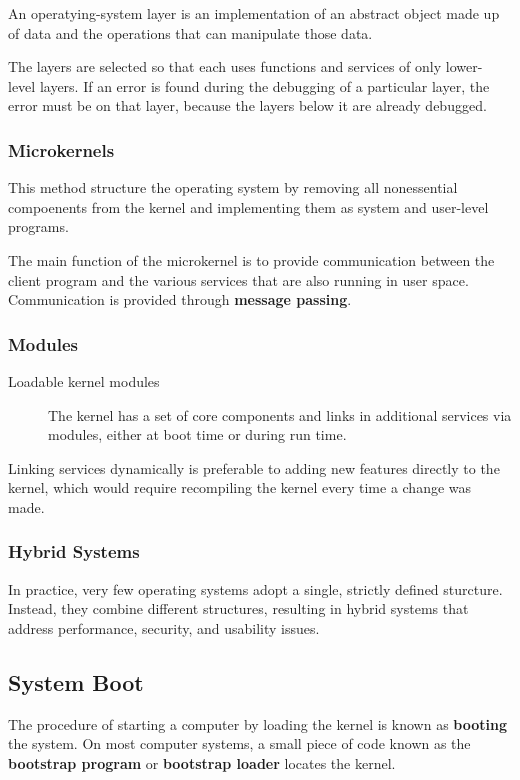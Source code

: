 \documentclass[]{article}
\begin{document}
An operatying-system layer is an implementation of an abstract object made up of
data and the operations that can manipulate those data.

The layers are selected so that each uses functions and services of only lower-
level layers. If an error is found during the debugging of a particular layer,
the error must be on that layer, because the layers below it are already
debugged.

\subsubsection*{Microkernels}
This method structure the operating system by removing all nonessential
compoenents from the kernel and implementing them as system and user-level
programs.

The main function of the microkernel is to provide communication between the
client program and the various services that are also running in user space.
Communication is provided through \textbf{message passing}.

\subsubsection*{Modules}
\begin{description}
\item[Loadable kernel modules] The kernel has a set of core components and links
in additional services via modules, either at boot time or during run time.
\end{description}

Linking services dynamically is preferable to adding new features directly to
the kernel, which would require recompiling the kernel every time a change was
made.

\subsubsection*{Hybrid Systems}
In practice, very few operating systems adopt a single, strictly defined
sturcture. Instead, they combine different structures, resulting in hybrid
systems that address performance, security, and usability issues.

\subsection*{System Boot}
The procedure of starting a computer by loading the kernel is known as \textbf{booting} the system. On most computer systems, a small piece of code known as the \textbf{bootstrap program} or \textbf{bootstrap loader} locates the kernel.
\end{document}
